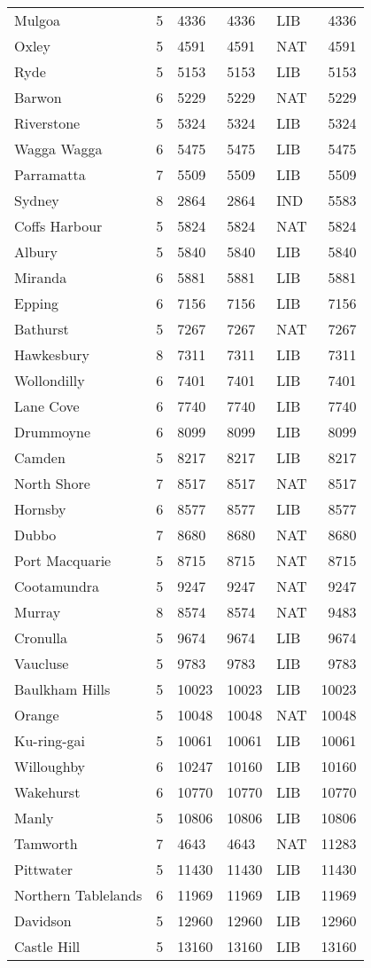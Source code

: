 \documentclass{article}
\begin{document}
\begin{center}
\begin{longtable}{lllllr}
Mulgoa & 5 & 4336 & 4336 & LIB & 4336\\
Oxley & 5 & 4591 & 4591 & NAT & 4591\\
Ryde & 5 & 5153 & 5153 & LIB & 5153\\
Barwon & 6 & 5229 & 5229 & NAT & 5229\\
Riverstone & 5 & 5324 & 5324 & LIB & 5324\\
Wagga Wagga & 6 & 5475 & 5475 & LIB & 5475\\
Parramatta & 7 & 5509 & 5509 & LIB & 5509\\
Sydney & 8 & 2864 & 2864 & IND & 5583\\
Coffs Harbour & 5 & 5824 & 5824 & NAT & 5824\\
Albury & 5 & 5840 & 5840 & LIB & 5840\\
Miranda & 6 & 5881 & 5881 & LIB & 5881\\
Epping & 6 & 7156 & 7156 & LIB & 7156\\
Bathurst & 5 & 7267 & 7267 & NAT & 7267\\
Hawkesbury & 8 & 7311 & 7311 & LIB & 7311\\
Wollondilly & 6 & 7401 & 7401 & LIB & 7401\\
Lane Cove & 6 & 7740 & 7740 & LIB & 7740\\
Drummoyne & 6 & 8099 & 8099 & LIB & 8099\\
Camden & 5 & 8217 & 8217 & LIB & 8217\\
North Shore & 7 & 8517 & 8517 & NAT & 8517\\
Hornsby & 6 & 8577 & 8577 & LIB & 8577\\
Dubbo & 7 & 8680 & 8680 & NAT & 8680\\
Port Macquarie & 5 & 8715 & 8715 & NAT & 8715\\
Cootamundra & 5 & 9247 & 9247 & NAT & 9247\\
Murray & 8 & 8574 & 8574 & NAT & 9483\\
Cronulla & 5 & 9674 & 9674 & LIB & 9674\\
Vaucluse & 5 & 9783 & 9783 & LIB & 9783\\
Baulkham Hills & 5 & 10023 & 10023 & LIB & 10023\\
Orange & 5 & 10048 & 10048 & NAT & 10048\\
Ku-ring-gai & 5 & 10061 & 10061 & LIB & 10061\\
Willoughby & 6 & 10247 & 10160 & LIB & 10160\\
Wakehurst & 6 & 10770 & 10770 & LIB & 10770\\
Manly & 5 & 10806 & 10806 & LIB & 10806\\
Tamworth & 7 & 4643 & 4643 & NAT & 11283\\
Pittwater & 5 & 11430 & 11430 & LIB & 11430\\
Northern Tablelands & 6 & 11969 & 11969 & LIB & 11969\\
Davidson & 5 & 12960 & 12960 & LIB & 12960\\
Castle Hill & 5 & 13160 & 13160 & LIB & 13160\\
\hline
\end{longtable}
\end{center}
\end{document}
